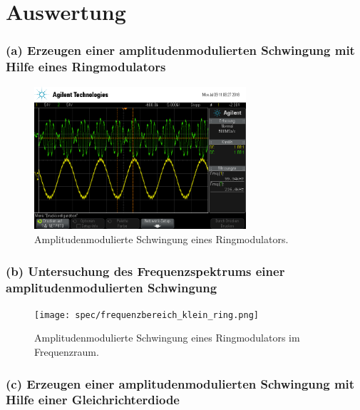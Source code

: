 \section{Auswertung}
\label{sec:Auswertung}


\subsubsection{(a) Erzeugen einer amplitudenmodulierten Schwingung mit
Hilfe eines Ringmodulators}
\label{subsubsec:auswertung_a}

\begin{figure}
  \centering
  \includegraphics[width=0.7\textwidth]{osci/amp_ringmodulator.png}
  \caption{Amplitudenmodulierte
  Schwingung eines Ringmodulators.}
  \label{fig:ringamp_zeit}
\end{figure}


\subsubsection{(b) Untersuchung des Frequenzspektrums einer
amplitudenmodulierten Schwingung}
\label{subsubsec:auswertung_b}

\begin{figure}
  \centering
  \texttt{[image: spec/frequenzbereich\_klein\_ring.png]}
  \caption{Amplitudenmodulierte
  Schwingung eines Ringmodulators im Frequenzraum.}
  \label{fig:ringamp_frequenz}
\end{figure}



\subsubsection{(c) Erzeugen einer amplitudenmodulierten Schwingung
mit Hilfe einer Gleichrichterdiode}
\label{subsubsec:auswertung_c}

